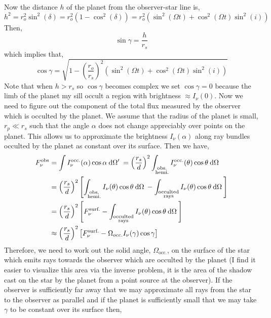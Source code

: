 \documentclass[12pt]{article}
\begin{document}
Now the distance $h$ of the planet from the observer-star line is,
\[ h^2 = r_o^2 \sin^2(\delta) = r_o^2 (1 - \cos^2{(\delta)}) = r_o^2 (\sin^2{(\Omega t)} + \cos^2{(\Omega t)} \sin^2{(i)}) \]
Then,
\[ \sin{\gamma} = \frac{h}{r_s} \]
which implies that,
\[ \cos{\gamma} = \sqrt{1 - \left( \frac{r_o}{r_s} \right)^2 (\sin^2{(\Omega t)} + \cos^2{(\Omega t)} \sin^2{(i)}) } \]
Note that when $h > r_s$ so $\cos{\gamma}$ becomes complex we set $\cos{\gamma} = 0$ because the limb of the planet my sill occult a region with brightness $\approx I_\nu(0)$. 
Now we need to figure out the component of the total flux measured by the observer which is occulted by the planet. We assume that the radius of the planet is small, $r_p \ll r_s$ such that the angle $\alpha$ does not change appreciably over points on the planet. This allows us to approximate the brightness $I_\nu(\alpha)$ along ray bundles occulted by the planet as constant over its surface. Then we have,
\begin{align*}
F_\nu^{\text{obs}} & = \int I_\nu^{\text{occ.}}(\alpha) \cos{\alpha} \: \mathrm{d}\Omega' \: = \left( \frac{r_s}{d} \right)^2 \int_{\substack{ \text{obs.} \\
\text{hemi.}}} I_\nu^{\text{occ.}}(\theta) \cos{\theta} \: \mathrm{d}\Omega \:
\\
& = \left( \frac{r_s}{d} \right)^2 \left[ \int_{\substack{ \text{obs.} \\
\text{hemi.}}} I_\nu(\theta) \cos{\theta} \: \mathrm{d}\Omega \: - \int_{\substack{ \text{occulted} \\
\text{rays}}} I_\nu(\theta) \cos{\theta} \: \mathrm{d}\Omega \: \right]
\\
& = \left( \frac{r_s}{d} \right)^2 \left[ F_\nu^{\text{surf}.} - \int_{\substack{ \text{occulted} \\
\text{rays}}} I_\nu(\theta) \cos{\theta} \: \mathrm{d}\Omega \: \right] 
\\
& \approx \left( \frac{r_s}{d} \right)^2 \left[ F_\nu^{\text{surf}.}-  \Omega_{occ.} I_\nu(\gamma) \cos{\gamma} \right] 
\end{align*}
Therefore, we need to work out the solid angle, $\Omega_{\text{occ.}}$, on the surface of the star which emits rays towards the observer which are occulted by the planet (I find it easier to visualize this area via the inverse problem, it is the area of the shadow cast on the star by the planet from a point source at the observer). If the observer is sufficiently far away that we may approximate all rays from the star to the observer as parallel and if the planet is sufficiently small that we may take $\gamma$ to be constant over its surface then,
\end{document}
